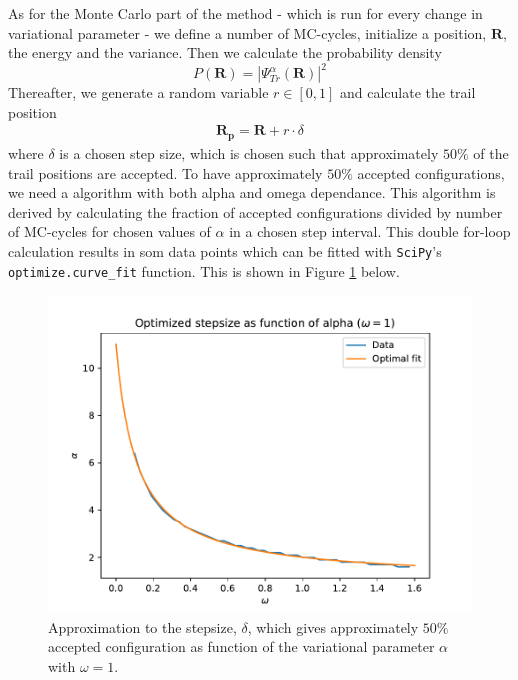 \documentclass[12pt,english,a4paper]{article}
\begin{document}
As for the Monte Carlo part of the method - which is run for every change in variational parameter - we define a number of MC-cycles, initialize a position, $\boldsymbol{R}$, the energy and the variance. Then we calculate the probability density
\begin{equation}
    P(\boldsymbol{R})=|\Psi_{Tr}^\alpha(\boldsymbol{R})|^2
    \label{eq:probalility_density}
\end{equation}
Thereafter, we generate a random variable $r\in [0,1]$ and calculate the trail position
\begin{align*}
    \boldsymbol{R_p}=\boldsymbol{R}+r\cdot\delta
\end{align*}
where $\delta$ is a chosen step size, which is chosen such that approximately $50\%$ of the trail positions are accepted. To have approximately $50\%$ accepted configurations, we need a algorithm with both alpha and omega dependance. This algorithm is derived by calculating the fraction of accepted configurations divided by number of MC-cycles for chosen values of $\alpha$ in a chosen step interval. This double for-loop calculation results in som data points which can be fitted with \texttt{SciPy}'s \texttt{optimize.curve\_fit} function. This is shown in Figure \ref{fig:best_stepsize_2D} below. 
\begin{figure}[H]
    \centering
    \includegraphics[scale=0.7]{../figures/best_steplength_2D.pdf}
    \caption{Approximation to the stepsize, $\delta$, which gives approximately $50\%$ accepted configuration as function of the variational parameter $\alpha$ with $\omega = 1$.}
    \label{fig:best_stepsize_2D}
\end{figure}
\end{document}
